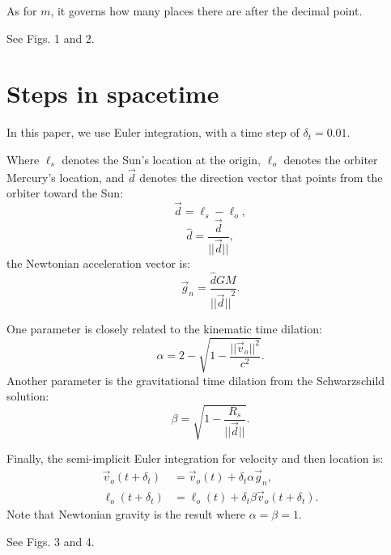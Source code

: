 \documentclass[12pt]{article}
\begin{document}
As for $m$, it governs how many places there are after the decimal point.

See Figs. 1 and 2.


\section{Steps in spacetime}

In this paper, we use Euler integration, with a time step of $\delta_{t} = 0.01$.

Where $\ell_s$ denotes the Sun's location at the origin, $\ell_o$ denotes the orbiter Mercury's location, and $\vec{d}$ denotes the direction vector that points from the orbiter toward the Sun:
\begin{equation}
\label{direction_vector}
\vec{d} = \ell_{s} - \ell_{o},	
\end{equation}
\begin{equation}
\label{direction_unit_vector}
\hat{d} = \frac{\vec{d}}{\lvert\lvert \vec{d} \rvert\rvert},
\end{equation}
the Newtonian acceleration vector is:
\begin{equation}
\label{newton}
\vec{g}_n = \frac{\hat{d} G M}{{\lvert\lvert \vec{d} \rvert\rvert}^2}.
\end{equation}

One parameter is closely related to the kinematic time dilation:
\begin{equation}
\label{eq_kinematic}
\alpha = 2 - \sqrt{1 - \frac{\lvert\lvert \vec{v}_{o}\rvert\rvert^2}{c^2}}.
\end{equation}
Another parameter is the gravitational time dilation from the Schwarzschild solution:
\begin{equation}
\label{eq_gravitational}
\beta = \sqrt{1 - \frac{R_{s}}{\lvert \lvert \vec{d} \rvert \rvert}}.
\end{equation}

Finally, the semi-implicit Euler integration for velocity and then location is:
\begin{align}
\label{eq_velocity}
\vec{v}_{o}(t + \delta_t) &= \vec{v}_{o}(t) + \delta_{t} \alpha \vec{g}_n, \\
\label{eq_position}
\ell_{o}(t + \delta_t) &= \ell_{o}(t) + \delta_{t} \beta \vec{v}_{o}(t + \delta_t).
\end{align}
Note that Newtonian gravity is the result where $\alpha = \beta = 1$.

See Figs. 3 and 4.
\end{document}
